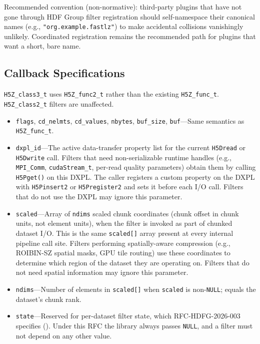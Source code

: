 \documentclass[../RFC-HDFG-2026-001.tex]{subfiles}
\begin{document}
Recommended convention (non-normative): third-party plugins that have
not gone through HDF Group filter registration should self-namespace
their canonical names (e.g., \texttt{"org.example.fastlz"}) to make
accidental collisions vanishingly unlikely.  Coordinated registration
remains the recommended path for plugins that want a short, bare name.

\subsection{Callback Specifications}
\label{sec:callback-specs}


\texttt{H5Z\_class3\_t} uses \texttt{H5Z\_func2\_t} rather than the
existing \texttt{H5Z\_func\_t}.  \texttt{H5Z\_class2\_t} filters are
unaffected.

\begin{itemize}
\item \texttt{flags}, \texttt{cd\_nelmts}, \texttt{cd\_values},
  \texttt{nbytes}, \texttt{buf\_size}, \texttt{buf}---Same semantics as
  \texttt{H5Z\_func\_t}.

\item \texttt{dxpl\_id}---The active data-transfer property list for the
  current \texttt{H5Dread} or \texttt{H5Dwrite} call.  Filters that need
  non-serializable runtime handles (e.g., \texttt{MPI\_Comm},
  \texttt{cudaStream\_t}, per-read quality parameters) obtain them by
  calling \texttt{H5Pget()} on this DXPL.  The caller registers a custom
  property on the DXPL with \texttt{H5Pinsert2} or \texttt{H5Pregister2}
  and sets it before each I/O call.  Filters that do not use the DXPL may
  ignore this parameter.

\item \texttt{scaled}---Array of \texttt{ndims} scaled chunk coordinates
  (chunk offset in chunk units, not element units), when the filter is
  invoked as part of chunked dataset I/O.  This is the same
  \texttt{scaled[]} array present at every internal pipeline call site.
  Filters performing spatially-aware compression (e.g., ROIBIN-SZ spatial
  masks, GPU tile routing) use these coordinates to determine which region
  of the dataset they are operating on.  Filters that do not need spatial
  information may ignore this parameter.

\item \texttt{ndims}---Number of elements in \texttt{scaled[]} when
  \texttt{scaled} is non-\texttt{NULL}; equals the dataset's chunk rank.

\item \texttt{state}---Reserved for per-dataset filter state, which
  RFC-HDFG-2026-003 specifies ().  Under this
  RFC the library always passes \texttt{NULL}, and a filter must not
  depend on any other value.
\end{itemize}
\end{document}
